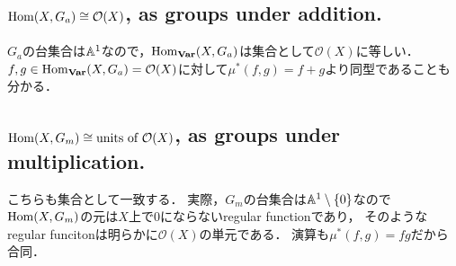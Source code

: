 \documentclass[a4paper]{jarticle}
\begin{document}
    \subsection{$\operatorname{Hom}(X,G_a) \cong \mathcal{O}(X)$, as groups under addition.}
    $G_a$の台集合は$\mathbb{A}^1$なので，$\operatorname{Hom}_{\mathbf{Var}}(X,G_a)$は集合として$\mathcal{O}(X)$に等しい．
    $f,g \in \operatorname{Hom}_{\mathbf{Var}}(X,G_a)=\mathcal{O}(X)$に対して$\mu^{\ast}(f,g)=f+g$より同型であることも分かる．

    \subsection{$\operatorname{Hom}(X,G_m) \cong \mbox{units of }\mathcal{O}(X)$, as groups under multiplication.}
    こちらも集合として一致する．
    実際，$G_m$の台集合は$\mathbb{A}^1 \setminus \{0\}$なので
    $\operatorname{Hom}(X,G_m)$の元は$X$上で0にならないregular functionであり，
    そのようなregular funcitonは明らかに$\mathcal{O}(X)$の単元である．
    演算も$\mu^{\ast}(f,g)=fg$だから合同．
\end{document}
